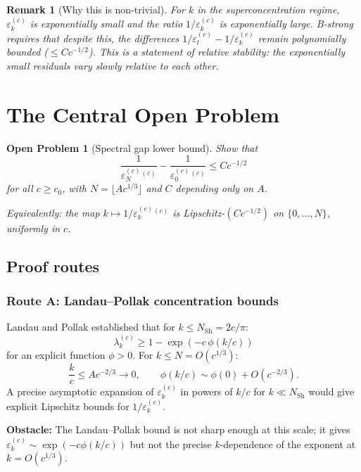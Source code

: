 \documentclass[12pt,a4paper]{article}
\newtheorem{remark}[theorem]{Remark}
\newtheorem{openproblem}[theorem]{Open Problem}
\newcommand{\lam}[1]{\lambda_{#1}^{(c)}}
\newcommand{\eps}[1]{\varepsilon_{#1}^{(c)}}
\begin{document}
\begin{remark}[Why this is non-trivial]
For $k$ in the superconcentration regime,
$\eps{k}$ is exponentially small and the ratio
$1/\eps{k}$ is exponentially large.
B-strong requires that despite this,
the \emph{differences} $1/\eps{l} - 1/\eps{k}$
remain polynomially bounded ($\leq C c^{-1/2}$).
This is a statement of \emph{relative stability}:
the exponentially small residuals vary slowly
\emph{relative to each other}.
\end{remark}

\section{The Central Open Problem}
\label{sec:open}

\begin{openproblem}[Spectral gap lower bound]
\label{op:gap}
Show that
\[
  \frac{1}{\eps{N}^{(c)}} - \frac{1}{\eps{0}^{(c)}}
  \leq C c^{-1/2}
\]
for all $c \geq c_0$, with $N = \lfloor Ac^{1/3}\rfloor$
and $C$ depending only on $A$.

\medskip
\noindent
Equivalently: the map $k \mapsto 1/\eps{k}^{(c)}$
is Lipschitz-$(C c^{-1/2})$ on $\{0, \ldots, N\}$,
uniformly in $c$.
\end{openproblem}

\subsection{Proof routes}

\subsubsection*{Route A: Landau--Pollak concentration bounds}

Landau and Pollak \cite{LandauPollak1961} established that
for $k \leq N_{\mathrm{Sh}} = 2c/\pi$:
\[
  \lam{k} \geq 1 - \exp(-c\,\phi(k/c))
\]
for an explicit function $\phi > 0$.
For $k \leq N = O(c^{1/3})$:
\[
  \frac{k}{c} \leq Ac^{-2/3} \to 0,
  \qquad \phi(k/c) \sim \phi(0) + O(c^{-2/3}).
\]
A precise asymptotic expansion of $\eps{k}$ in powers
of $k/c$ for $k \ll N_{\mathrm{Sh}}$ would give
explicit Lipschitz bounds for $1/\eps{k}$.

\textbf{Obstacle:} The Landau--Pollak bound is not sharp
enough at this scale; it gives
$\eps{k} \sim \exp(-c\phi(k/c))$
but not the precise $k$-dependence of the exponent
at $k = O(c^{1/3})$.
\end{document}
